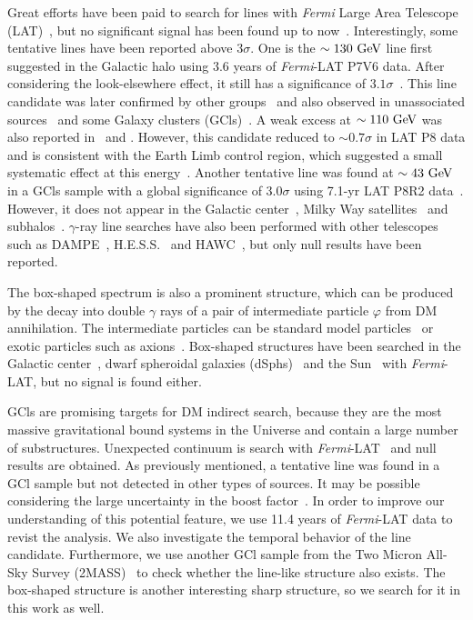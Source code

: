 \documentclass[
	twocolumn,
]{aastex6} %
\newcommand{\fermi}{\emph{Fermi}\xspace}
\newcommand{\lat}{\emph{Fermi}-LAT\xspace}
\newcommand{\gr}{$\gamma$-ray\xspace}
\newcommand{\grs}{$\gamma$ rays\xspace}
\begin{document}
Great efforts have been paid to search for lines with \fermi Large Area Telescope (LAT)~\citep{FermiLAT2009}, but no significant signal has been found up to now~\citep{Abdo2010,Vertongen2011,Ackermann2012,Bringmann2012,Weniger2012,Tempel2012,Su2012a,Su2012,Huang2012,Tempel2012b,Ackermann2013a,Hektor2013,Albert2014,Ackermann2015,Anderson2016,Liang2016,Liang2016b,QuincyAdams2016,Liang2017,LiS2019}.
Interestingly, some tentative lines have been reported above $3\sigma$.
One is the $\sim 130~\rm GeV$ line first suggested in the Galactic halo using 3.6 years of \lat P7V6 data.
After considering the look-elsewhere effect, it still has a significance of $3.1\sigma$~\citep{Bringmann2012,Weniger2012}.
This line candidate was later confirmed by other groups~\citep{Tempel2012,Su2012a,Ackermann2013a} and also observed in unassociated sources~\citep{Su2012} and some Galaxy clusters (GCls)~\citep{Hektor2013}.
A weak excess at $\sim 110~\rm GeV$ was also reported in~\citet{Su2012} and \citet{Tempel2012b}.
However, this candidate reduced to $\sim 0.7\sigma$ in LAT P8 data and is consistent with the Earth Limb control region, which suggested a small systematic effect at this energy~\citep{Ackermann2015}.
Another tentative line was found at $\sim 43~\rm GeV$ in a GCls sample with a global significance of $3.0\sigma$ using 7.1-yr LAT P8R2 data~\citep{Liang2016}.
However, it does not appear in the Galactic center~\citep{Ackermann2015}, Milky Way satellites~\citep{Liang2016b} and subhalos~\citep{Liang2017,LiS2019}.
\gr line searches have also been performed with other telescopes such as DAMPE~\citep{Shen2019}, H.E.S.S.~\citep{Abdallah2018a,Abdalla2018b} and HAWC~\citep{Albert2020}, but only null results have been reported.

The box-shaped spectrum is also a prominent structure, which can be produced by the decay into double \grs of a pair of intermediate particle $\varphi$ from DM annihilation.
The intermediate particles can be standard model particles~\citep{Ibarra2012} or exotic particles such as axions~\citep{Ibarra2013}.
Box-shaped structures have been searched in the Galactic center~\citep{Ibarra2012,Ibarra2013}, dwarf spheroidal galaxies (dSphs)~\citep{LiS2018} and the Sun~\citep{Mazziotta2020} with \lat, but no signal is found either.

GCls are promising targets for DM indirect search, because they are the most massive gravitational bound systems in the Universe and contain a large number of substructures.
Unexpected continuum is search with \lat~\citep{Ackermann2010,Dugger2010,Huang2012b,Lisanti2018} and null results are obtained.
As previously mentioned, a tentative line was found in a GCl sample but not detected in other types of sources.
It may be possible considering the large uncertainty in the boost factor~\citep{Gao2012}.
In order to improve our understanding of this potential feature, we use 11.4 years of \lat data to revist the analysis.
We also investigate the temporal behavior of the line candidate.
Furthermore, we use another GCl sample from the Two Micron All-Sky Survey (2MASS)~\citep{Tully2015,Kourkchi2017,Lisanti2018} to check whether the line-like structure also exists.
The box-shaped structure is another interesting sharp structure, so we search for it in this work as well.
\end{document}
